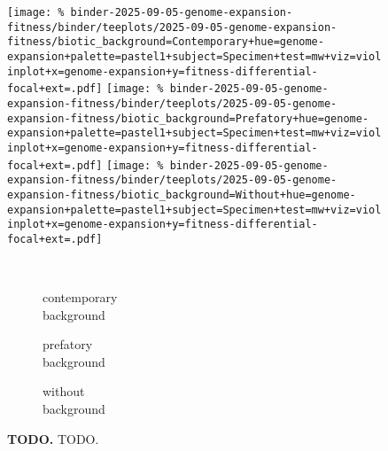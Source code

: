 \begin{figure}

\texttt{[image: \%
binder-2025-09-05-genome-expansion-fitness/binder/teeplots/2025-09-05-genome-expansion-fitness/biotic\_background=Contemporary+hue=genome-expansion+palette=pastel1+subject=Specimen+test=mw+viz=violinplot+x=genome-expansion+y=fitness-differential-focal+ext=.pdf]}
\texttt{[image: \%
binder-2025-09-05-genome-expansion-fitness/binder/teeplots/2025-09-05-genome-expansion-fitness/biotic\_background=Prefatory+hue=genome-expansion+palette=pastel1+subject=Specimen+test=mw+viz=violinplot+x=genome-expansion+y=fitness-differential-focal+ext=.pdf]}%
\texttt{[image: \%
binder-2025-09-05-genome-expansion-fitness/binder/teeplots/2025-09-05-genome-expansion-fitness/biotic\_background=Without+hue=genome-expansion+palette=pastel1+subject=Specimen+test=mw+viz=violinplot+x=genome-expansion+y=fitness-differential-focal+ext=.pdf]}

\vspace{-1ex}

\begin{subfigure}{0.135\linewidth}
~
\end{subfigure}%
\begin{subfigure}{0.305\linewidth}
    \centering
    \caption{\footnotesize contemporary\\background}
    \label{fig:genome-expansion:contemporary}
\end{subfigure}%
\begin{subfigure}{0.305\linewidth}
    \centering
    \caption{\footnotesize prefatory\\background}
    \label{fig:genome-expansion:prefatory}
\end{subfigure}%
\begin{subfigure}{0.255\linewidth}
    \centering
    \caption{\footnotesize without\\background}
    \label{fig:genome-expansion:without}
\end{subfigure}

\caption{
    \textbf{TODO.}
    \footnotesize
    TODO.
}
\label{fig:genome-expansion}

\end{figure}
